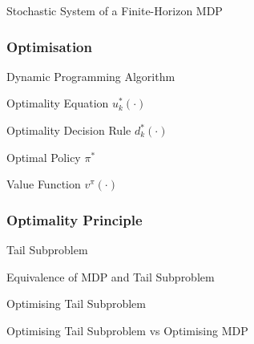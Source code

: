 \documentclass[11pt,a4paper]{article}
\begin{document}
  \begin{proposition}{Stochastic System of a Finite-Horizon MDP}

  \end{proposition}

\subsubsection{Optimisation}

  \begin{remark}{Dynamic Programming Algorithm}

  \end{remark}

  \begin{definition}{Optimality Equation $u^*_k(\cdot)$}

  \end{definition}

  \begin{definition}{Optimality Decision Rule $d^*_k(\cdot)$}

  \end{definition}

  \begin{definition}{Optimal Policy $\pi^*$}

  \end{definition}

  \begin{definition}{Value Function $v^\pi(\cdot)$}
  \end{definition}


\subsubsection{Optimality Principle} %

  \begin{definition}{Tail Subproblem}

  \end{definition}

  \begin{remark}{Equivalence of MDP and Tail Subproblem}

  \end{remark}

  \begin{proposition}{Optimising Tail Subproblem}

  \end{proposition}

  \begin{remark}{Optimising Tail Subproblem vs Optimising MDP}

  \end{remark}
\end{document}
